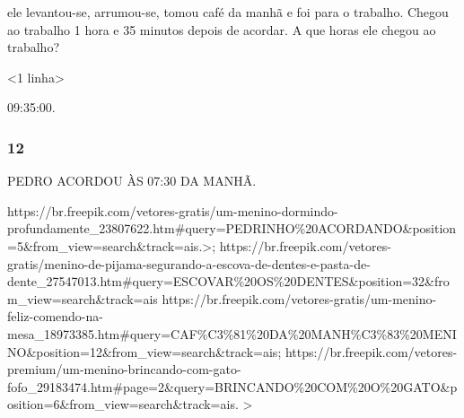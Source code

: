 ele levantou-se, arrumou-se, tomou café da manhã e foi para o trabalho. Chegou ao trabalho 1 hora e 35 minutos depois de acordar. A que horas ele chegou ao trabalho?

\textless{}1 linha\textgreater{}

09:35:00.

\subsubsection{12}\label{section-50}

PEDRO ACORDOU ÀS 07:30 DA MANHÃ.

https://br.freepik.com/vetores-gratis/um-menino-dormindo-profundamente\_23807622.htm\#query=PEDRINHO\%20ACORDANDO\&position=5\&from\_view=search\&track=ais.\textgreater{};
https://br.freepik.com/vetores-gratis/menino-de-pijama-segurando-a-escova-de-dentes-e-pasta-de-dente\_27547013.htm\#query=ESCOVAR\%20OS\%20DENTES\&position=32\&from\_view=search\&track=ais
https://br.freepik.com/vetores-gratis/um-menino-feliz-comendo-na-mesa\_18973385.htm\#query=CAF\%C3\%81\%20DA\%20MANH\%C3\%83\%20MENINO\&position=12\&from\_view=search\&track=ais;
https://br.freepik.com/vetores-premium/um-menino-brincando-com-gato-fofo\_29183474.htm\#page=2\&query=BRINCANDO\%20COM\%20O\%20GATO\&position=6\&from\_view=search\&track=ais.
\textgreater{}

